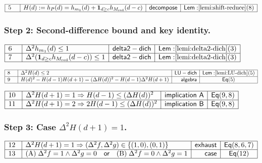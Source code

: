\documentclass[11pt,reqno]{amsart}
\begin{document}
\nointerlineskip\noindent$%
\begin{array}{|m{0.5cm}|l|r|c|}
\hline
5 & H(d):=h_{P}(d)=h_{m_{1}}(d)+\mathbf{1}_{d\ge c}h_{M_{\mathrm{red}}}(d-c)
& \mathsf{decompose} & \mathsf{Lem:}\ref{lemi:shift-reduce}(8) \\ \hline
\end{array}%
$

\subsubsection*{Step 2: Second-difference bound and key identity.}

\noindent$%
\begin{array}{|m{0.5cm}|l|r|c|}
\hline
6 & \Delta^{2}h_{m_{1}}(d)\le1 & \mathsf{delta2-dich} & \mathsf{Lem:}\ref%
{lemi:delta2-dich}(3) \\ \hline
7 & \Delta^{2}(\mathbf{1}_{d\ge c}h_{M_{\mathrm{red}}}(d-c))\le1 & \mathsf{%
delta2-dich} & \mathsf{Lem:}\ref{lemi:delta2-dich}(3) \\ \hline
\end{array}%
$

\nointerlineskip\noindent$%
\begin{array}{|m{0.5cm}|l|r|c|}
\hline
8 & \Delta^{2}H(d)\le2 & \mathsf{LU-dich} & \mathsf{Lem:}\ref{lemi:LU-dich}%
(5) \\ \hline
9 & H(d)^{2}-H(d-1)H(d+1)=(\Delta H(d))^{2}-H(d-1)\Delta^{2}H(d+1) & \mathsf{%
algebra} & \mathsf{Eq}(5) \\ \hline
\end{array}%
$

\nointerlineskip\noindent$%
\begin{array}{|m{0.5cm}|l|r|c|}
\hline
10 & \Delta^{2}H(d+1)=1\Rightarrow H(d-1)\le(\Delta H(d))^{2} & \mathsf{%
implication\ A} & \mathsf{Eq}(9,8) \\ \hline
11 & \Delta^{2}H(d+1)=2\Rightarrow2H(d-1)\le(\Delta H(d))^{2} & \mathsf{%
implication\ B} & \mathsf{Eq}(9,8) \\ \hline
\end{array}%
$

\subsubsection*{Step 3: Case $\Delta^{2}H(d+1)=1$.}

\noindent$%
\begin{array}{|m{0.5cm}|l|r|c|}
\hline
12 & \Delta^{2}H(d+1)=1\Rightarrow(\Delta^{2}f,\Delta^{2}g)\in\{(1,0),(0,1)\}
& \mathsf{exhaust} & \mathsf{Eq}(8,6,7) \\ \hline
13 & \text{(A)}\;\Delta^{2}f=1\wedge\Delta^{2}g=0\quad\mathsf{or}\quad\text{%
(B)}\;\Delta^{2}f=0\wedge\Delta^{2}g=1 & \mathsf{case} & \mathsf{Eq}(12) \\ 
\hline
\end{array}%
$
\end{document}
